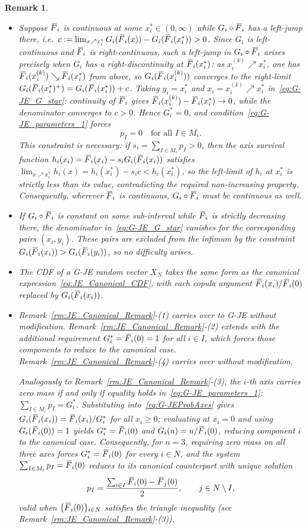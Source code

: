\documentclass[letterpaper,12pt]{article}
\numberwithin{equation}{section}
\newtheorem{remark}[theorem]{Remark}
\newcommand{\N}{{N}}
\newcommand{\M}{{M}}
\newcommand{\I}{{I}}
\newcommand{\F}{\,\overline{\kern-0.175em F\kern-0em}}
\begin{document}
{\begin{remark}
\begin{itemize}
\item[(2)]
Suppose $\F_i$ is continuous at some $x_i^*\in(0,\infty)$ while
$G_i\circ\F_i$ has a left-jump there, i.e.\
$c:=\lim_{x\nearrow x_i^*}G_i(\F_i(x))-G_i(\F_i(x_i^*))>0$.
Since $G_i$ is left-continuous and $\F_i$ is right-continuous, such a
left-jump in $G_i\circ\F_i$ arises precisely when $G_i$ has a
right-discontinuity at $\F_i(x_i^*)$: as $x_i^{(k)}\nearrow x_i^*$, one has
$\F_i(x_i^{(k)})\searrow\F_i(x_i^*)$ from above, so $G_i(\F_i(x_i^{(k)}))$
converges to the right-limit $G_i(\F_i(x_i^*)^+)=G_i(\F_i(x_i^*))+c$.
Taking $y_i=x_i^*$ and $x_i=x_i^{(k)}\nearrow x_i^*$
in~\eqref{eq:G-JE_G_star}: continuity of $\F_i$ gives
$\F_i(x_i^{(k)})-\F_i(x_i^*)\to0$, while the denominator converges to $c>0$.
Hence $G_i^*=0$, and condition~\eqref{eq:G-JE_parameters_1} forces
\[
p_{\I}=0\quad\text{for all }\I\in\M_i.
\]
This constraint is necessary: if $s_i=\sum_{\I\in\M_i}p_\I>0$, then the
axis survival function $h_i(x_i)=\F_i(x_i)-s_i G_i(\F_i(x_i))$ satisfies
$\lim_{x\nearrow x_i^*}h_i(x)=h_i(x_i^*)-s_i c<h_i(x_i^*)$,
so the left-limit of $h_i$ at $x_i^*$ is strictly less than its value,
contradicting the required non-increasing property. Consequently, wherever
$\F_i$ is continuous, $G_i\circ\F_i$ must be continuous as well.

\item[(3)]
If $G_i\circ\F_i$ is constant on some sub-interval while $\F_i$ is strictly
decreasing there, the denominator in~\eqref{eq:G-JE_G_star} vanishes for the
corresponding pairs $(x_i,y_i)$. These pairs are excluded from the infimum by
the constraint $G_i(\F_i(x_i))>G_i(\F_i(y_i))$, so no difficulty arises.

\item[(4)]
The CDF of a G-JE random vector $X_\N$ takes the same form as the canonical
expression~\eqref{eq:JE_Canonical_CDF}, with each copula argument
$\F_i(x_i)/\F_i(0)$ replaced by $G_i(\F_i(x_i))$.

\item[(5)]
Remark~\ref{rm:JE_Canonical_Remark}-(1) carries over to G-JE without
modification. Remark~\ref{rm:JE_Canonical_Remark}-(2) extends with the
additional requirement $G_i^*=\F_i(0)=1$ for all $i\in\I$, which forces
those components to reduce to the canonical case.
Remark~\ref{rm:JE_Canonical_Remark}-(4) carries over without modification.

Analogously to Remark~\ref{rm:JE_Canonical_Remark}-(3), the $i$-th axis
carries zero mass if and only if equality holds in~\eqref{eq:G-JE_parameters_1}:
$\sum_{\I\in\M_i}p_\I=G_i^*$. Substituting
into~\eqref{eq:G-JEProbAxes} gives $G_i(\F_i(x_i))=\F_i(x_i)/G_i^*$ for
all $x_i\ge0$; evaluating at $x_i=0$ and using $G_i(\F_i(0))=1$ yields
$G_i^*=\F_i(0)$ and $G_i(u)=u/\F_i(0)$, reducing component $i$ to the
canonical case. Consequently, for $n=3$, requiring zero mass on all three
axes forces $G_i^*=\F_i(0)$ for every $i\in\N$, and the system
$\sum_{\I\in\M_i}p_\I=\F_i(0)$ reduces to its canonical counterpart with
unique solution
\[
p_\I=\frac{\sum_{i\in\I}\F_i(0)-\F_j(0)}{2},\qquad j\in\N\setminus\I,
\]
valid when $\{\F_i(0)\}_{i\in\N}$ satisfies the triangle inequality
(see Remark~\ref{rm:JE_Canonical_Remark}-(3)).


\end{itemize}
\end{remark}}
\end{document}
